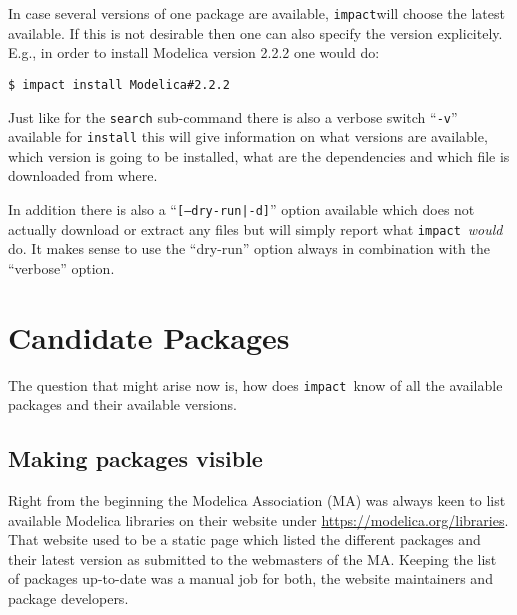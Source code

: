 \documentclass[11pt,a4paper,twocolumn]{article}
\newcommand{\impact}{\texttt{impact}} %
\newcommand{\code}[1]{\texttt{#1}} %
\begin{document}
In case several versions of one package are available, \impact will choose
the latest available. If this is not desirable then one can also specify the
version explicitely. E.g., in order to install Modelica version 2.2.2
one would do:
\begin{lstlisting}
$ impact install Modelica#2.2.2
\end{lstlisting}

Just like for the \code{search} sub-command there is also a verbose switch
``\code{-v}'' available for \code{install} this will give information on what
versions are available, which version is going to be installed, what are the
dependencies and which file is downloaded from where.

In addition there is also a ``\code{[--dry-run|-d]}'' option available which
does not actually download or extract any files but will simply report what
\impact\ \emph{would} do.
It makes sense to use the ``dry-run'' option always in combination with the
``verbose'' option.



\section{Candidate Packages}
\label{sec:candidates}

The question that might arise now is, how does \impact\ know of all the
available packages and their available versions.

\subsection{Making packages visible}
\label{sec:collection}
Right from the beginning the Modelica Association (MA) was always keen to list
available Modelica libraries on their website under
\url{https://modelica.org/libraries}.
That website used to be a static page which listed the different packages and
their latest version as submitted to the webmasters of the MA.
Keeping the list of packages up-to-date was a manual job for both, the website
maintainers and package developers.
\end{document}
